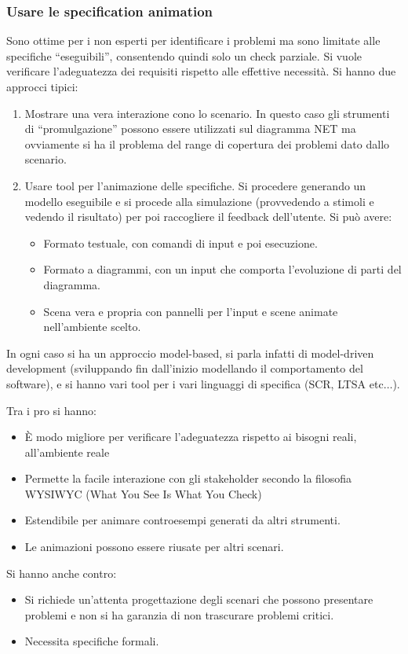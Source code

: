 \subsubsection{Usare le specification animation}
Sono ottime per i non esperti per identificare i problemi ma sono limitate alle
specifiche “eseguibili”, consentendo quindi solo un check parziale. Si vuole
verificare l'adeguatezza dei requisiti rispetto alle effettive necessità. Si
hanno due approcci tipici:
\begin{enumerate}
    \item Mostrare una vera interazione cono lo scenario. In questo caso gli
          strumenti di “promulgazione” possono essere utilizzati sul diagramma NET ma
          ovviamente si ha il problema del range di copertura dei problemi dato dallo
          scenario.
    \item Usare tool per l'animazione delle specifiche. Si procedere generando
          un modello eseguibile e si procede alla simulazione (provvedendo a stimoli e
          vedendo il risultato) per poi raccogliere il feedback dell'utente. Si può avere:
          \begin{itemize}
              \item Formato testuale, con comandi di input e poi esecuzione.
              \item Formato a diagrammi, con un input che comporta l'evoluzione
                    di parti del diagramma.
              \item Scena vera e propria con pannelli per l'input e scene animate
                    nell'ambiente scelto.
          \end{itemize}
\end{enumerate}
In ogni caso si ha un approccio model-based, si parla infatti di model-driven
development (sviluppando fin dall'inizio modellando il comportamento del software),
e si hanno vari tool per i vari linguaggi di specifica (SCR, LTSA etc$\dots$).

Tra i pro si hanno:
\begin{itemize}
    \item È modo migliore per verificare l'adeguatezza rispetto ai bisogni reali,
          all'ambiente reale
    \item Permette la facile interazione con gli stakeholder secondo la filosofia
          WYSIWYC (What You See Is What You Check)
    \item Estendibile per animare controesempi generati da altri strumenti.
    \item Le animazioni possono essere riusate per altri scenari.
\end{itemize}
Si hanno anche contro:
\begin{itemize}
    \item Si richiede un'attenta progettazione degli scenari che possono presentare
          problemi e non si ha garanzia di non trascurare problemi critici.
    \item Necessita specifiche formali.
\end{itemize}
